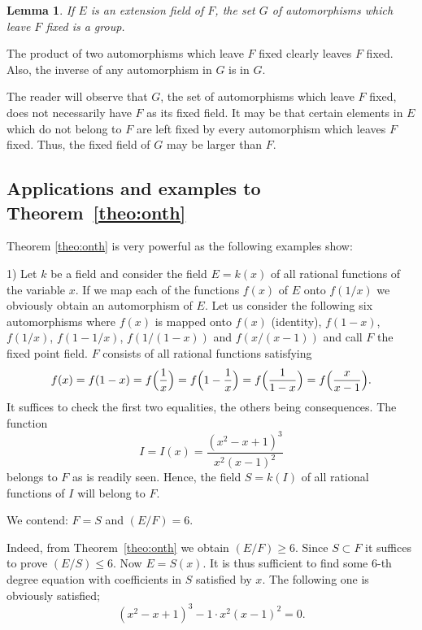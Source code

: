 \documentclass[11pt]{article}
\newtheorem*{lemm}{Lemma}
\theoremstyle{definition}
\begin{document}
\begin{lemm}
If $E$ is an extension field of $F$, the set $G$ of automorphisms which leave $F$ fixed is a group.
\end{lemm}


The product of two automorphisms which leave $F$ fixed clearly leaves $F$ fixed.
Also, the inverse of any automorphism in $G$ is in $G$.

The reader will observe that $G$, the set of automorphisms which leave $F$ fixed, does not necessarily have $F$ as its fixed field.
It may be that certain elements in $E$ which do not belong to $F$ are left fixed by every automorphism which leaves $F$ fixed.
Thus, the fixed field of $G$ may be larger than $F$.


\subsection{Applications and examples to Theorem~\ref{theo:onth}}


Theorem \ref{theo:onth} is very powerful as the following examples show:


1)
Let $k$ be a field and consider the field $E = k(x)$ of all rational functions of the variable $x$.
If we map each of the functions $f(x)$ of $E$ onto $f(1/x)$ we obviously obtain an automorphism of $E$.
Let us consider the following six automorphisms where $f(x)$ is mapped onto $f(x)$ (identity), $f(1-x)$, $f(1/x)$, $f(1-1/x)$, $f(1/(1-x))$ and $f(x/(x-1))$ and call $F$ the fixed point field.
$F$ consists of all rational functions satisfying
\begin{equation}
\label{eq:twGon}
f(x)
= f(1-x)
= f\Bigl(\frac 1x\Bigr)
= f\Bigl(1 - \frac 1x\Bigr)
= f\Bigl(\frac 1{1-x}\Bigr)
= f\Bigl(\frac{x}{x-1}\Bigr).
\end{equation}
It suffices to check the first two equalities, the others being consequences.
The function
\begin{equation}
\label{eq:twGtw}
I = I(x) = \frac{(x^2 - x + 1)^3}{x^2(x-1)^2}
\end{equation}
belongs to $F$ as is readily seen.
Hence, the field $S = k(I)$ of all rational functions of $I$ will belong to $F$.

We contend: $F = S$ and $(E/F) = 6$.

Indeed, from Theorem~\ref{theo:onth} we obtain $(E/F) \geq 6$.
Since $S \subset F$ it suffices to prove $(E/S) \leq 6$.
Now $E = S(x)$.
It is thus sufficient to find some 6-th degree equation with coefficients in $S$ satisfied by $x$.
The following one is obviously satisfied;
\[
        (x^2 - x + 1)^3 - 1 \cdot x^2(x-1)^2 = 0.
\]
\end{document}
